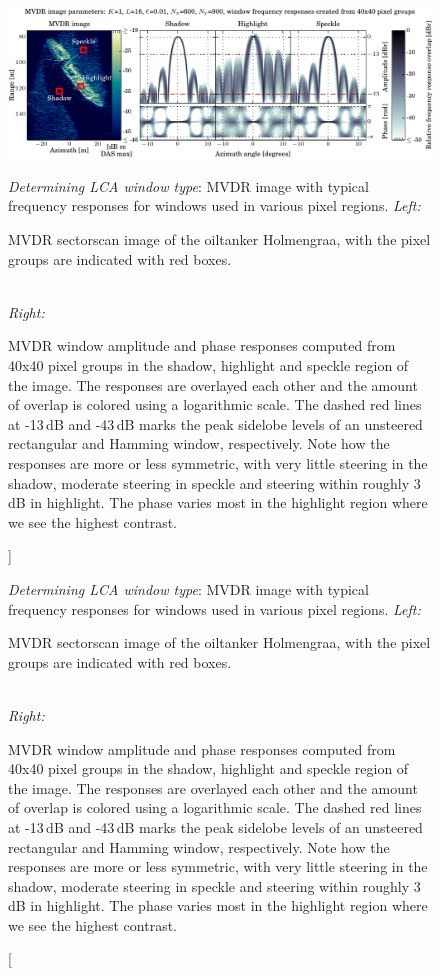 \documentclass[10pt,journal,draftclsnofoot,onecolumn]{IEEEtran}
\let\MYoriglatexcaption\caption               %
\renewcommand{\caption}[2][\relax]{\MYoriglatexcaption[#2]{#2}}
\newcommand\1{\vec 1}
\providecommand{\DIFaddbeginFL}{} %
\providecommand{\DIFaddendFL}{} %
\providecommand{\DIFdelbeginFL}{} %
\providecommand{\DIFdelendFL}{} %
\begin{document}
\setcounter{topnumber}{1}
\setcounter{dbltopnumber}{1}

\begin{figure}[t]\centering%
\DIFdelbeginFL %
\DIFdelendFL \DIFaddbeginFL \includegraphics[width=\linewidth]{gfx/mvdr_selected_windows_holmengraa.pdf}\DIFaddendFL %
\caption{\emph{Determining LCA window type}: MVDR image with typical frequency responses for windows used in various pixel regions.\newline
\emph{Left:}\hfill
\parbox[t]{.95\linewidth}{MVDR sectorscan image of the oiltanker Holmengraa, with the pixel groups are indicated with red boxes.}\protect\\\hspace{\textwidth}
\emph{Right:}\hfill
\parbox[t]{.95\linewidth}{MVDR window amplitude and phase responses computed from 40x40 pixel groups in the shadow, highlight and speckle region of the image. The responses are overlayed each other and the amount of overlap is colored using a logarithmic scale. The dashed red lines at -13\,dB and -43\,dB marks the peak sidelobe levels of an unsteered rectangular and Hamming window, respectively. Note how the responses are more or less symmetric, with very little steering in the shadow, moderate steering in speckle and steering within roughly 3\,dB in highlight. The phase varies most in the highlight region where we see the highest contrast.} }\label{mvdr_selected_windows}
\end{figure}
\end{document}
